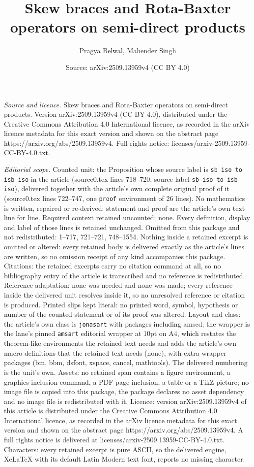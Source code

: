 \documentclass[10pt,a4paper]{amsart}
\title[Skew braces and Rota-Baxter operators on semi-direct product]{Skew braces and Rota-Baxter operators on semi-direct products}
\author{Pragya Belwal, Mahender Singh}
\date{Source: arXiv:2509.13959v4 (CC BY 4.0)}
\begin{document}
\maketitle

\noindent\emph{Source and licence.} Skew braces and Rota-Baxter operators on semi-direct products. Version arXiv:2509.13959v4 (CC BY 4.0), distributed under the Creative Commons Attribution 4.0 International licence, as recorded in the arXiv licence metadata for this exact version and shown on the abstract page https://arxiv.org/abs/2509.13959v4. Full rights notice: licenses/arxiv-2509.13959-CC-BY-4.0.txt.\par\smallskip

\noindent\textit{Editorial scope.} Counted unit: the Proposition whose source label is \texttt{sb iso to isb iso} in the article (source0.tex lines 718--720, source label \texttt{sb iso to isb iso}), delivered together with the article's own complete original proof of it (source0.tex lines 722--747, one \texttt{proof} environment of 26 lines). No mathematics is written, repaired or re-derived: statement and proof are the article's own text line for line. Required context retained uncounted: none. Every definition, display and label of those lines is retained unchanged. Omitted from this package and not redistributed: 1--717, 721--721, 748--1554. Nothing inside a retained excerpt is omitted or altered: every retained body is delivered exactly as the article's lines are written, so no omission receipt of any kind accompanies this package. Citations: the retained excerpts carry no citation command at all, so no bibliography entry of the article is transcribed and no reference is redistributed. Reference adaptation: none was needed and none was made; every reference inside the delivered unit resolves inside it, so no unresolved reference or citation is produced. Printed slips kept literal: no printed word, symbol, hypothesis or number of the counted statement or of its proof was altered. Layout and class: the article's own class is \texttt{jonasart} with packages including amscd; the wrapper is the lane's pinned \texttt{amsart} editorial wrapper at 10pt on A4, which restates the theorem-like environments the retained text needs and adds the article's own macro definitions that the retained text needs (none), with extra wrapper packages (bm, bbm, dsfont, xspace, cancel, mathtools). The delivered numbering is the unit's own. Assets: no retained span contains a figure environment, a graphics-inclusion command, a PDF-page inclusion, a table or a TikZ picture; no image file is copied into this package, the package declares no asset dependency and no image file is redistributed with it. Licence: version arXiv:2509.13959v4 of this article is distributed under the Creative Commons Attribution 4.0 International licence, as recorded in the arXiv licence metadata for this exact version and shown on the abstract page https://arxiv.org/abs/2509.13959v4. A full rights notice is delivered at licenses/arxiv-2509.13959-CC-BY-4.0.txt. Characters: every retained excerpt is pure ASCII, so the delivered engine, XeLaTeX with its default Latin Modern text font, reports no missing character.
\end{document}
